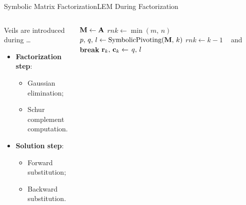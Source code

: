 \begin{frame}{Symbolic Matrix Factorization}{\ac{LEM} During Factorization}
  \vspace{-2.0em}
  \begin{columns}
    \hspace{1.0em}
    \begin{column}[c]{0.425\textwidth}
      Veils are introduced during \dots
      \begin{itemize}
        \item \textbf{Factorization step}: \\
        \begin{itemize}\small
          \item[] Gaussian elimination;
          \item[] Schur complement computation.
        \end{itemize}
        \item \textbf{Solution step}: \\
        \begin{itemize}\small
          \item[] Forward substitution;
          \item[] Backward substitution.
        \end{itemize}
      \end{itemize}
    \end{column}
    \begin{column}[c]{0.4\textwidth}
      \vspace{-1.0em}
      \hspace{-1.0em}
      \begin{algorithmic}\scriptsize
          \State $\mathbf{M} \gets \mathbf{A}$ %
          \State $rnk \gets \min(m, \, n)$ %
            \State $p, \, q, \, l \gets \text{SymbolicPivoting}(\mathbf{M}, \, k)$ %
              \State $rnk \gets k-1$ ~ and ~ %
              \textbf{break} %
            \EndIf
            \State $\mathbf{r}_k, \, \mathbf{c}_k \gets \, q, \, l$ %

\end{algorithmic}
\end{column}
\end{columns}
\end{frame}
